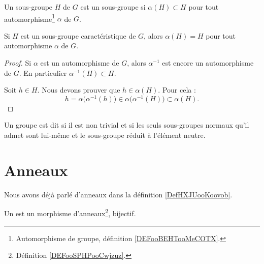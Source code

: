 \begin{definition}      \label{DEFooUXXTooCCLmQe}
	Un sous-groupe \( H\) de \( G\) est un sous-groupe  si \( \alpha(H)\subset H\) pour tout automorphisme\footnote{Automorphisme de groupe, définition \ref{DEFooBEHTooMeCOTX}.} \( \alpha\) de \( G\).
\end{definition}

\begin{lemma}
	Si \( H\) est un sous-groupe caractéristique de \( G\), alors \( \alpha(H)=H\) pour tout automorphisme \( \alpha\) de \( G\).
\end{lemma}

\begin{proof}
	Si \( \alpha\) est un automorphisme de \( G\), alors \( \alpha^{-1}\) est encore un automorphisme de \( G\). En particulier \( \alpha^{-1}(H)\subset H\).

	Soit \( h\in H\). Nous devons prouver que \( h\in \alpha(H)\). Pour cela :
	\begin{equation}
		h=\alpha\big( \alpha^{-1}(h) \big)\in \alpha\big( \alpha^{-1}(H) \big)\subset\alpha(H).
	\end{equation}
\end{proof}

\begin{definition}                 \label{DefGroupeSimple}
	Un groupe est dit  si il est non trivial et si les seuls sous-groupes normaux qu'il admet sont lui-même et le sous-groupe réduit à l'élément neutre.
\end{definition}

\section{Anneaux}

Nous avons déjà parlé d'anneaux dans la définition \ref{DefHXJUooKoovob}.

\begin{definition}      \label{DEFooKWKGooIOwGTA}
	Un  est un morphisme d'anneaux\footnote{Définition \ref{DEFooSPHPooCwjzuz}.}, bijectif.
\end{definition}


